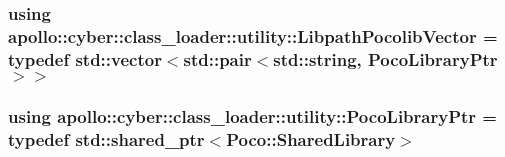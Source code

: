 \hypertarget{namespaceapollo_1_1cyber_1_1class__loader_1_1utility_a1cb3907890434c1bb35adf496751b6f7}{
\subsubsection[{Libpath\-Pocolib\-Vector}]{\setlength{\rightskip}{0pt plus 5cm}using {\bf apollo\-::cyber\-::class\-\_\-loader\-::utility\-::\-Libpath\-Pocolib\-Vector} = typedef std\-::vector$<$std\-::pair$<$std\-::string, {\bf Poco\-Library\-Ptr}$>$$>$}}\label{namespaceapollo_1_1cyber_1_1class__loader_1_1utility_a1cb3907890434c1bb35adf496751b6f7}
\hypertarget{namespaceapollo_1_1cyber_1_1class__loader_1_1utility_abe591df068142cddd76a66dd4f8277e7}{
\subsubsection[{Poco\-Library\-Ptr}]{\setlength{\rightskip}{0pt plus 5cm}using {\bf apollo\-::cyber\-::class\-\_\-loader\-::utility\-::\-Poco\-Library\-Ptr} = typedef std\-::shared\-\_\-ptr$<$Poco\-::\-Shared\-Library$>$}}\label{namespaceapollo_1_1cyber_1_1class__loader_1_1utility_abe591df068142cddd76a66dd4f8277e7}


